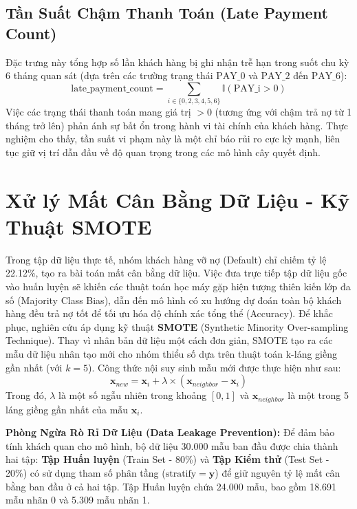 \subsection{Tần Suất Chậm Thanh Toán (Late Payment Count)}
Đặc trưng này tổng hợp số lần khách hàng bị ghi nhận trễ hạn trong suốt chu kỳ 6 tháng quan sát (dựa trên các trường trạng thái $\text{PAY\_0}$ và $\text{PAY\_2}$ đến $\text{PAY\_6}$):
\begin{equation}
    \text{late\_payment\_count} = \sum_{i \in \{0, 2, 3, 4, 5, 6\}} \mathbb{I}(\text{PAY\_i} > 0)
\end{equation}
Việc các trạng thái thanh toán mang giá trị $>0$ (tương ứng với chậm trả nợ từ 1 tháng trở lên) phản ánh sự bất ổn trong hành vi tài chính của khách hàng. Thực nghiệm cho thấy, tần suất vi phạm này là một chỉ báo rủi ro cực kỳ mạnh, liên tục giữ vị trí dẫn đầu về độ quan trọng trong các mô hình cây quyết định.

\section{Xử lý Mất Cân Bằng Dữ Liệu - Kỹ Thuật SMOTE}

Trong tập dữ liệu thực tế, nhóm khách hàng vỡ nợ (Default) chỉ chiếm tỷ lệ 22.12\%, tạo ra bài toán mất cân bằng dữ liệu. Việc đưa trực tiếp tập dữ liệu gốc vào huấn luyện sẽ khiến các thuật toán học máy gặp hiện tượng thiên kiến lớp đa số (Majority Class Bias), dẫn đến mô hình có xu hướng dự đoán toàn bộ khách hàng đều trả nợ tốt để tối ưu hóa độ chính xác tổng thể (Accuracy).
Để khắc phục, nghiên cứu áp dụng kỹ thuật \textbf{SMOTE} (Synthetic Minority Over-sampling Technique). Thay vì nhân bản dữ liệu một cách đơn giản, SMOTE tạo ra các mẫu dữ liệu nhân tạo mới cho nhóm thiểu số dựa trên thuật toán k-láng giềng gần nhất (với $k=5$). Công thức nội suy sinh mẫu mới được thực hiện như sau:
\begin{equation}
    \mathbf{x}_{new} = \mathbf{x}_i + \lambda \times (\mathbf{x}_{neighbor} - \mathbf{x}_i)
\end{equation}
Trong đó, $\lambda$ là một số ngẫu nhiên trong khoảng $[0, 1]$ và $\mathbf{x}_{neighbor}$ là một trong 5 láng giềng gần nhất của mẫu $\mathbf{x}_i$.

\textbf{Phòng Ngừa Rò Rỉ Dữ Liệu (Data Leakage Prevention):} Để đảm bảo tính khách quan cho mô hình, bộ dữ liệu 30.000 mẫu ban đầu được chia thành hai tập: \textbf{Tập Huấn luyện} (Train Set - 80\%) và \textbf{Tập Kiểm thử} (Test Set - 20\%) có sử dụng tham số phân tầng ($\text{stratify} = \mathbf{y}$) để giữ nguyên tỷ lệ mất cân bằng ban đầu ở cả hai tập. Tập Huấn luyện chứa 24.000 mẫu, bao gồm 18.691 mẫu nhãn 0 và 5.309 mẫu nhãn 1.

